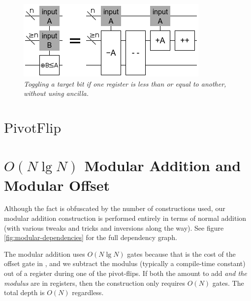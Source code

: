 \documentclass[twocolumn]{article}
\begin{document}
\begin{figure}
  \centering
  \includegraphics[width=\linewidth]{assets/comparison-leq.png}
  \caption{\em Toggling a target bit if one register is less than or equal to another, without using ancilla.}
  \label{fig:comparison-leq}
\end{figure}

\section{$\text{PivotFlip}$}

\section{$O(N \lg N)$ Modular Addition and Modular Offset} \label{sec:last-circuit}

Although the fact is obfuscated by the number of constructions used, our modular addition construction is performed entirely in terms of normal addition (with various tweaks and tricks and inversions along the way).
See figure \ref{fig:modular-dependencies} for the full dependency graph.

The modular addition uses $O(N \lg N)$ gates because that is the cost of the offset gate in \cite{haner2016}, and we subtract the modulus (typically a compile-time constant) out of a register during one of the pivot-flips.
If both the amount to add {\em and the modulus} are in registers, then the construction only requires $O(N)$ gates.
The total depth is $O(N)$ regardless.
\end{document}
